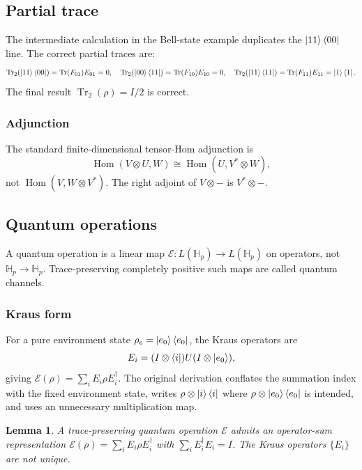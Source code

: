 \documentclass[12pt]{article}
\theoremstyle{plain}
\newtheorem{lemma}[thm]{Lemma}
\theoremstyle{definition}
\begin{document}
\subsection{Partial trace}

The intermediate calculation in the Bell-state example duplicates the $\ket{11}\bra{00}$ line. The correct partial traces are:
\[
\operatorname{Tr}_2(\ket{11}\bra{00})=\operatorname{Tr}(F_{01})E_{01}=0,\quad
\operatorname{Tr}_2(\ket{00}\bra{11})=\operatorname{Tr}(F_{10})E_{10}=0,\quad
\operatorname{Tr}_2(\ket{11}\bra{11})=\operatorname{Tr}(F_{11})E_{11}=\ket{1}\bra{1}.
\]
The final result $\operatorname{Tr}_2(\rho)=I/2$ is correct.

\subsubsection*{Adjunction}

The standard finite-dimensional tensor-Hom adjunction is
\[
\operatorname{Hom}(V\otimes U,W)\cong\operatorname{Hom}(U,V^*\otimes W),
\]
not $\operatorname{Hom}(V,W\otimes V^*)$. The right adjoint of $V\otimes-$ is $V^*\otimes-$.

\subsection{Quantum operations}

A quantum operation is a linear map $\mathcal{E}:L(\mathbb{H}_p)\to L(\mathbb{H}_p)$ on operators, not $\mathbb{H}_p\to\mathbb{H}_p$. Trace-preserving completely positive such maps are called quantum channels.

\subsubsection*{Kraus form}

For a pure environment state $\rho_e=\ket{e_0}\bra{e_0}$, the Kraus operators are
\[
E_i=(I\otimes\bra{i})U(I\otimes\ket{e_0}),
\]
giving $\mathcal{E}(\rho)=\sum_i E_i\rho E_i^\dagger$. The original derivation conflates the summation index with the fixed environment state, writes $\rho\otimes\ket{i}\bra{i}$ where $\rho\otimes\ket{e_0}\bra{e_0}$ is intended, and uses an unnecessary multiplication map.

\begin{lemma}
A trace-preserving quantum operation $\mathcal{E}$ admits an operator-sum representation $\mathcal{E}(\rho)=\sum_i E_i\rho E_i^\dagger$ with $\sum_i E_i^\dagger E_i=I$. The Kraus operators $\{E_i\}$ are not unique.
\end{lemma}
\end{document}
